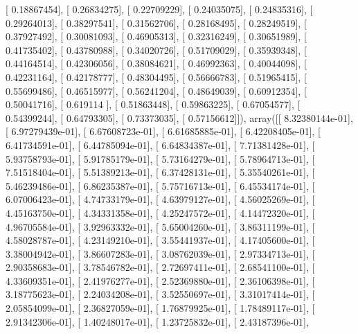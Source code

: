 \documentclass{article}
\begin{document}
       [ 0.18867454],
       [ 0.26834275],
       [ 0.22709229],
       [ 0.24035075],
       [ 0.24835316],
       [ 0.29264013],
       [ 0.38297541],
       [ 0.31562706],
       [ 0.28168495],
       [ 0.28249519],
       [ 0.37927492],
       [ 0.30081093],
       [ 0.46905313],
       [ 0.32316249],
       [ 0.30651989],
       [ 0.41735402],
       [ 0.43780988],
       [ 0.34020726],
       [ 0.51709029],
       [ 0.35939348],
       [ 0.44164514],
       [ 0.42306056],
       [ 0.38084621],
       [ 0.46992363],
       [ 0.40044098],
       [ 0.42231164],
       [ 0.42178777],
       [ 0.48304495],
       [ 0.56666783],
       [ 0.51965415],
       [ 0.55699486],
       [ 0.46515977],
       [ 0.56241204],
       [ 0.48649039],
       [ 0.60912354],
       [ 0.50041716],
       [ 0.619114  ],
       [ 0.51863448],
       [ 0.59863225],
       [ 0.67054577],
       [ 0.54399244],
       [ 0.64793305],
       [ 0.73373035],
       [ 0.57156612]]), array([[  8.32380144e-01],
       [  6.97279439e-01],
       [  6.67608723e-01],
       [  6.61685885e-01],
       [  6.42208405e-01],
       [  6.41734591e-01],
       [  6.44785094e-01],
       [  6.64834387e-01],
       [  7.71381428e-01],
       [  5.93758793e-01],
       [  5.91785179e-01],
       [  5.73164279e-01],
       [  5.78964713e-01],
       [  7.51518404e-01],
       [  5.51389213e-01],
       [  6.37428131e-01],
       [  5.35540261e-01],
       [  5.46239486e-01],
       [  6.86235387e-01],
       [  5.75716713e-01],
       [  6.45534174e-01],
       [  6.07006423e-01],
       [  4.74733179e-01],
       [  4.63979127e-01],
       [  4.56025269e-01],
       [  4.45163750e-01],
       [  4.34331358e-01],
       [  4.25247572e-01],
       [  4.14472320e-01],
       [  4.96705584e-01],
       [  3.92963332e-01],
       [  5.65004260e-01],
       [  3.86311199e-01],
       [  4.58028787e-01],
       [  4.23149210e-01],
       [  3.55441937e-01],
       [  4.17405600e-01],
       [  3.38004942e-01],
       [  3.86607283e-01],
       [  3.08762039e-01],
       [  2.97334713e-01],
       [  2.90358683e-01],
       [  3.78546782e-01],
       [  2.72697411e-01],
       [  2.68541100e-01],
       [  4.33609351e-01],
       [  2.41976277e-01],
       [  2.52369880e-01],
       [  2.36106398e-01],
       [  3.18775623e-01],
       [  2.24034208e-01],
       [  3.52550697e-01],
       [  3.31017414e-01],
       [  2.05854099e-01],
       [  2.36827059e-01],
       [  1.76879925e-01],
       [  1.78489117e-01],
       [  2.91342306e-01],
       [  1.40248017e-01],
       [  1.23725832e-01],
       [  2.43187396e-01],
\end{document}
